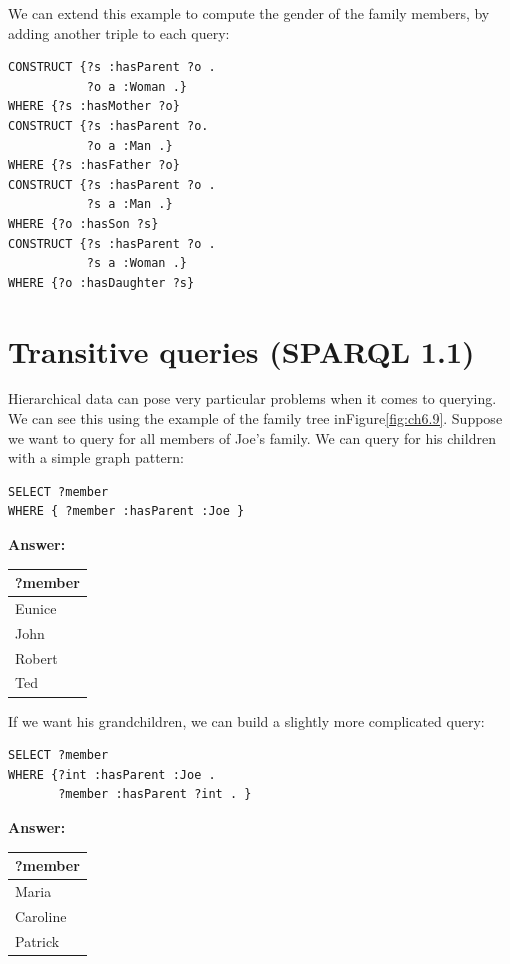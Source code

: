 \begin{challenge}
We can extend this example to compute the gender of the family members,
by adding another triple to each query:

\begin{lstlisting}
CONSTRUCT {?s :hasParent ?o .
           ?o a :Woman .}
WHERE {?s :hasMother ?o} 
CONSTRUCT {?s :hasParent ?o.
           ?o a :Man .} 
WHERE {?s :hasFather ?o} 
CONSTRUCT {?s :hasParent ?o .
           ?s a :Man .} 
WHERE {?o :hasSon ?s} 
CONSTRUCT {?s :hasParent ?o .
           ?s a :Woman .}
WHERE {?o :hasDaughter ?s}
\end{lstlisting}
\end{challenge}

\section{Transitive queries (SPARQL 1.1)}

Hierarchical data can pose very particular problems when it comes to
querying. We can see this using the example of the family tree inFigure\ref{fig:ch6.9}.
Suppose we want to query for all members of Joe's family. We can
query for his children with a simple graph pattern:


\begin{lstlisting}
SELECT ?member
WHERE { ?member :hasParent :Joe }
\end{lstlisting}

\textbf{\textbf{Answer:}}

\begin{tabular}{|l|}
\hline
?member\\
\hline
Eunice\\
John\\
Robert\\
Ted\\
\hline
\end{tabular}

If we want his grandchildren, we can build a slightly more complicated
query:


\begin{lstlisting}
SELECT ?member
WHERE {?int :hasParent :Joe .
       ?member :hasParent ?int . }
\end{lstlisting}

\textbf{\textbf{Answer:}}

\begin{tabular}{|l|}
\hline
?member\\
\hline
Maria\\
Caroline\\
Patrick\\
\hline
\end{tabular}

